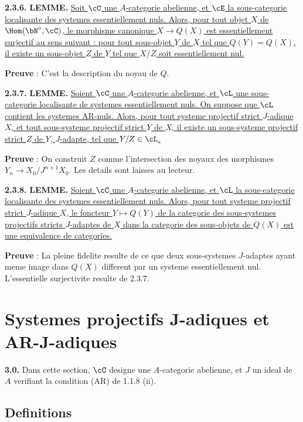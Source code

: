 \medskip
\noindent\textbf{2.3.6.} \textbf{LEMME.} \underline{Soit $\cC$ une $A$-categorie abelienne, et $\cE$ la sous-categorie localisante des systemes essentiellement nuls. Alors, pour tout objet $X$ de $\Hom(\bN^\circ, \cC)$, le morphisme canonique $X \longrightarrow Q(X)$ est essentiellement surjectif au sens suivant : pour tout sous-objet $Y$ de $X$ tel que $Q(Y) = Q(X)$, il existe un sous-objet $Z$ de $Y$ tel que $X/Z$ soit essentiellement nul.}

\textbf{Preuve} : C'est la description du noyau de $Q$.

\medskip
\noindent\textbf{2.3.7.} \textbf{LEMME.} \underline{Soient $\cC$ une $A$-categorie abelienne, et $\cL$ une sous-categorie localisante de systemes essentiellement nuls. On suppose que $\cL$ contient les systemes AR-nuls. Alors, pour tout systeme projectif strict $J$-adique $X$, et tout sous-systeme projectif strict $Y$ de $X$, il existe un sous-systeme projectif strict $Z$ de $Y$, $J$-adapte, tel que $Y/Z \in \cL$.}

\textbf{Preuve} : On construit $Z$ comme l'intersection des noyaux des morphismes $Y_n \longrightarrow X_0/J^{n+1}X_0$. Les details sont laisses au lecteur.

\medskip
\noindent\textbf{2.3.8.} \textbf{LEMME.} \underline{Soient $\cC$ une $A$-categorie abelienne, et $\cL$ la sous-categorie localisante des systemes essentiellement nuls. Alors, pour tout systeme projectif strict $J$-adique $X$, le foncteur $Y \mapsto Q(Y)$ de la categorie des sous-systemes projectifs stricts $J$-adaptes de $X$ dans la categorie des sous-objets de $Q(X)$ est une equivalence de categories.}

\textbf{Preuve} : La pleine fidelite resulte de ce que deux sous-systemes $J$-adaptes ayant meme image dans $Q(X)$ different par un systeme essentiellement nul. L'essentielle surjectivite resulte de 2.3.7.


\section{Systemes projectifs J-adiques et AR-J-adiques}

\medskip
\noindent\textbf{3.0.} Dans cette section, $\cC$ designe une $A$-categorie abelienne, et $J$ un ideal de $A$ verifiant la condition (AR) de 1.1.8 (ii).

\subsection{Definitions}

